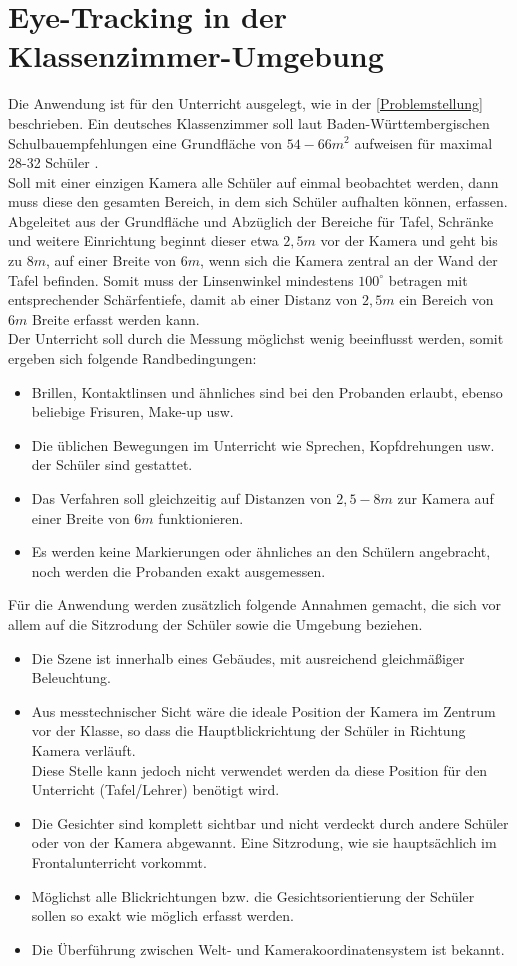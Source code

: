 \section{Eye-Tracking in der Klassenzimmer-Umgebung}
Die Anwendung ist für den Unterricht ausgelegt, wie in der \autoref{Problemstellung} beschrieben. Ein deutsches Klassenzimmer soll laut Baden-Württembergischen Schulbauempfehlungen eine Grundfläche von $54-66m^2$ aufweisen für maximal 28-32 Schüler \cite{bauordung}.\\ Soll mit einer einzigen Kamera alle Schüler auf einmal beobachtet werden, dann muss diese den gesamten Bereich, in dem sich Schüler aufhalten können, erfassen. Abgeleitet aus der Grundfläche und Abzüglich der Bereiche für Tafel, Schränke und weitere Einrichtung beginnt dieser etwa $2,5m$ vor der Kamera und geht bis zu $8m$, auf einer Breite von $6m$, wenn sich die Kamera zentral an der Wand der Tafel befinden. Somit muss der Linsenwinkel mindestens $100^\circ$ betragen mit entsprechender Schärfentiefe, damit ab einer Distanz von $2,5m$ ein Bereich von $6m$ Breite erfasst werden kann.\\
Der Unterricht soll durch die Messung möglichst wenig beeinflusst werden, somit ergeben sich folgende Randbedingungen:
\begin{itemize}
\item Brillen, Kontaktlinsen und ähnliches sind bei den Probanden erlaubt, ebenso beliebige Frisuren, Make-up usw.
\item Die üblichen Bewegungen im Unterricht wie Sprechen, Kopfdrehungen usw. der Schüler sind gestattet.
\item Das Verfahren soll gleichzeitig auf Distanzen von $2,5 - 8m$ zur Kamera auf einer Breite von $6m$ funktionieren.
\item Es werden keine Markierungen oder ähnliches an den Schülern angebracht, noch werden die Probanden exakt ausgemessen.
\end{itemize}
Für die Anwendung werden zusätzlich folgende Annahmen gemacht, die sich vor allem auf die Sitzrodung der Schüler sowie die Umgebung beziehen.
\begin{itemize}
\item Die Szene ist innerhalb eines Gebäudes, mit ausreichend gleichmäßiger Beleuchtung.
\item Aus messtechnischer Sicht wäre die ideale Position der Kamera im Zentrum vor der Klasse, so dass die Hauptblickrichtung der Schüler in Richtung Kamera verläuft.\\
Diese Stelle kann jedoch nicht verwendet werden da diese Position für den Unterricht (Tafel/Lehrer) benötigt wird.
\item Die Gesichter sind komplett sichtbar und nicht verdeckt durch andere Schüler oder von der Kamera abgewannt. Eine Sitzrodung, wie sie hauptsächlich im Frontalunterricht vorkommt.
\item Möglichst alle Blickrichtungen bzw. die Gesichtsorientierung der Schüler sollen so exakt wie möglich erfasst werden.
\item Die Überführung zwischen Welt- und Kamerakoordinatensystem ist bekannt.
\end{itemize}